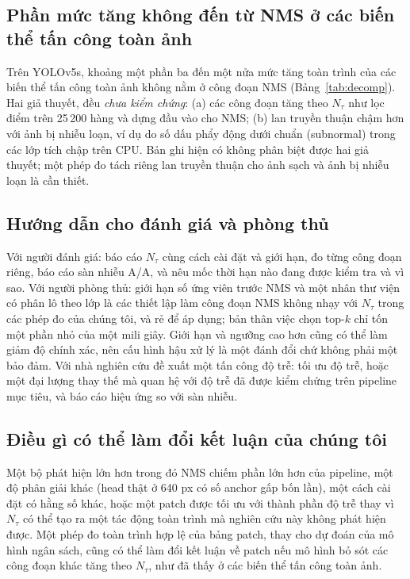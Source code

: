 \documentclass[a4paper,fleqn]{cas-dc}
\newcommand{\Ntau}{N_{\tau}}
\begin{document}
\subsection{Phần mức tăng không đến từ NMS ở các biến thể tấn công toàn ảnh}
Trên YOLOv5s, khoảng một phần ba đến một nửa mức tăng toàn trình của các biến thể tấn công toàn ảnh không nằm ở công đoạn NMS (Bảng~\ref{tab:decomp}). Hai giả thuyết, đều \emph{chưa kiểm chứng}: (a) các công đoạn tăng theo $\Ntau$ như lọc điểm trên 25\,200 hàng và dựng đầu vào cho NMS; (b) lan truyền thuận chậm hơn với ảnh bị nhiễu loạn, ví dụ do số dấu phẩy động dưới chuẩn (subnormal) trong các lớp tích chập trên CPU. Bản ghi hiện có không phân biệt được hai giả thuyết; một phép đo tách riêng lan truyền thuận cho ảnh sạch và ảnh bị nhiễu loạn là cần thiết.

\subsection{Hướng dẫn cho đánh giá và phòng thủ}
Với người đánh giá: báo cáo $\Ntau$ cùng cách cài đặt và giới hạn, đo từng công đoạn riêng, báo cáo sàn nhiễu A/A, và nêu mốc thời hạn nào đang được kiểm tra và vì sao. Với người phòng thủ: giới hạn số ứng viên trước NMS và một nhân thư viện có phân lô theo lớp là các thiết lập làm công đoạn NMS không nhạy với $\Ntau$ trong các phép đo của chúng tôi, và rẻ để áp dụng; bản thân việc chọn top-$k$ chỉ tốn một phần nhỏ của một mili giây. Giới hạn và ngưỡng cao hơn cũng có thể làm giảm độ chính xác, nên cấu hình hậu xử lý là một đánh đổi chứ không phải một bảo đảm. Với nhà nghiên cứu đề xuất một tấn công độ trễ: tối ưu độ trễ, hoặc một đại lượng thay thế mà quan hệ với độ trễ đã được kiểm chứng trên pipeline mục tiêu, và báo cáo hiệu ứng so với sàn nhiễu.

\subsection{Điều gì có thể làm đổi kết luận của chúng tôi}
Một bộ phát hiện lớn hơn trong đó NMS chiếm phần lớn hơn của pipeline, một độ phân giải khác (head thật ở 640 px có số anchor gấp bốn lần), một cách cài đặt có hằng số khác, hoặc một patch được tối ưu với thành phần độ trễ thay vì $\Ntau$ có thể tạo ra một tác động toàn trình mà nghiên cứu này không phát hiện được. Một phép đo toàn trình hợp lệ của bảng patch, thay cho dự đoán của mô hình ngân sách, cũng có thể làm đổi kết luận về patch nếu mô hình bỏ sót các công đoạn khác tăng theo $\Ntau$, như đã thấy ở các biến thể tấn công toàn ảnh.
\end{document}
